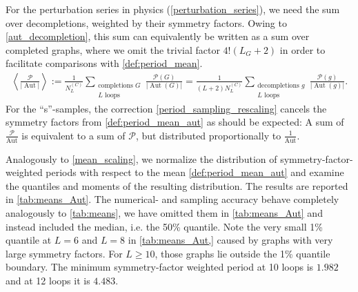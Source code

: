 \documentclass[11pt,a4paper]{article}
\newcommand{\abs}[1]{\lvert #1 \rvert}
\newcommand{\period}{\mathcal P}
\newcommand{\Aut}{\operatorname{Aut}}
\renewcommand{\|}{\rule[-0.4ex]{0.2ex}{1.2em}}
\begin{document}
For the   perturbation series in physics (\cref{perturbation_series}), we need the sum over decompletions, weighted by their symmetry factors. Owing to \cref{aut_decompletion}, this sum can equivalently be written as a sum over completed graphs, where we omit the trivial factor  $4! (L_G+2)$ in order to facilitate comparisons with \cref{def:period_mean}. 
\begin{align}\label{def:period_mean_aut}
	\left \langle \frac{\period}{\abs{\Aut}}  \right \rangle  :=  \frac{1}{N^{(C)}_L}\sum_{\substack{ \text{completions }G \\ L \text{ loops} }} \frac{\period (G)}{\abs{\Aut (G)}} = \frac{1}{(L+2) N^{(C)}_L  } \sum_{\substack{ \text{decompletions }g \\ L \text{ loops} }} \frac{\period (g)}{\abs{\Aut (g)}}  . 
\end{align}
For the \enquote{s}-samples, the correction \cref{period_sampling_rescaling} cancels the symmetry factors from \cref{def:period_mean_aut} as should be expected: A sum of $\frac{\period}{\Aut}$ is equivalent to a sum of $\period$, but distributed proportionally to $\frac{1}{\Aut}$.

Analogously to \cref{mean_scaling}, we normalize the distribution of symmetry-factor-weighted periods with respect to the mean \cref{def:period_mean_aut} and examine the quantiles and moments of the resulting distribution. The results are reported in \cref{tab:means_Aut}. The numerical- and sampling accuracy behave completely analogously to \cref{tab:means}, we have omitted them in \cref{tab:means_Aut} and instead included the median, i.e. the 50\% quantile.  Note the very small 1\% quantile at $L=6$ and $L=8$ in \cref{tab:means_Aut,} caused by graphs with very large symmetry factors. For $L \geq 10$, those graphs lie outside the 1\% quantile boundary. The minimum symmetry-factor weighted period at 10 loops is $1.982$ and at 12 loops it is $4.483$.
\end{document}

